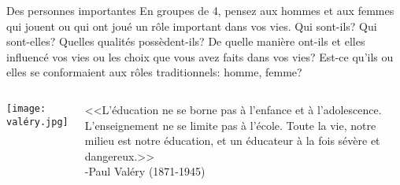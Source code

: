 \begin{frame}{Des personnes importantes}
  En groupes de 4, pensez aux hommes et aux femmes qui jouent ou qui ont joué un rôle important dans vos vies.
  Qui sont-ils?
  Qui sont-elles? Quelles qualités possèdent-ils?
  De quelle manière ont-ils et elles influencé vos vies ou les choix que vous avez faits dans vos vies?
  Est-ce qu'ils ou elles se conformaient aux rôles traditionnels: homme, femme?
  \begin{columns}
      \begin{center}
        \texttt{[image: valéry.jpg]}
      \end{center}
      <<L'éducation ne se borne pas à l'enfance et à l'adolescence.
      L'enseignement ne se limite pas à l'école.
      Toute la vie, notre milieu est notre éducation, et un éducateur à la fois sévère et dangereux.>> \\
      \hfill -Paul Valéry (1871-1945)
  \end{columns}
\end{frame}